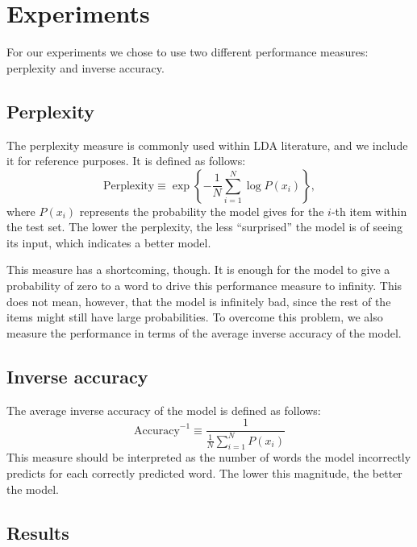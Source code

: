 \documentclass[a4paper,10pt]{article}
\begin{document}
\section{Experiments}
\label{sec:experiments}

For our experiments we chose to use two different performance measures: perplexity and inverse accuracy.

\subsection{Perplexity}

The perplexity measure is commonly used within LDA literature, and we include it for reference purposes. 
It is defined as follows:
\begin{equation}
\text{Perplexity} \equiv \exp \left\{ -\frac{1}{N} \sum_{i = 1}^N \log P(x_i)  \right\},
\end{equation}
where \(P(x_i)\) represents the probability the model gives for the $i$-th item within the test set. The lower the perplexity, the less ``surprised'' the model is of seeing its input, which indicates a better model.

This measure has a shortcoming, though. 
It is enough for the model to give a probability of zero to a word to drive this performance measure to infinity. 
This does not mean, however, that the model is infinitely bad, since the rest of the items might still have large probabilities.
To overcome this problem, we also measure the performance in terms of the average inverse accuracy of the model.

\subsection{Inverse accuracy}

The average inverse accuracy of the model is defined as follows:
\begin{equation}
\text{Accuracy}^{-1} \equiv \frac{1}{\frac{1}{N}\sum_{i = 1}^N P(x_i)}
\end{equation}
This measure should be interpreted as the number of words the model incorrectly predicts for each correctly predicted word. 
The lower this magnitude, the better the model.

\subsection{Results}
\end{document}
